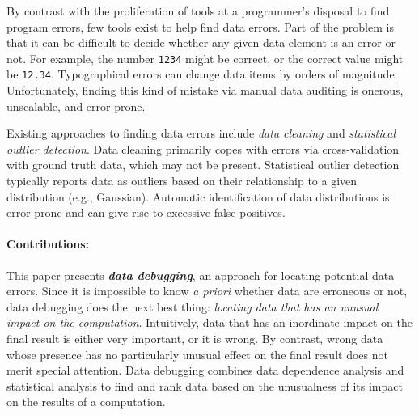 


By contrast with the proliferation of tools at a programmer's disposal
to find program errors, few tools exist to help find data errors. Part
of the problem is that it can be difficult to decide whether any given
data element is an error or not. For example, the number \texttt{1234}
might be correct, or the correct value might
be \texttt{12.34}. Typographical errors can change data items by
orders of magnitude. Unfortunately, finding this kind of mistake via
manual data auditing is onerous, unscalable, and error-prone.




Existing approaches to finding data errors include
\emph{data cleaning} and  \emph{statistical outlier detection}.
Data cleaning primarily copes with errors via
cross-validation with ground truth data, which may not be
present. Statistical outlier detection typically reports data as
outliers based on their relationship to a given distribution (e.g.,
Gaussian).  Automatic identification of data distributions is
error-prone and can give rise to excessive false positives.



\paragraph{Contributions:}
This paper presents \emph{\bf data debugging}, an approach for locating
potential data errors. Since it is impossible to know \emph{a priori}
whether data are erroneous or not, data debugging does the next best
thing: \emph{locating data that has an unusual
impact on the computation}. Intuitively, data that has an inordinate impact on the final
result is either very important, or it is wrong. By contrast, wrong
data whose presence has no particularly unusual effect on the final result does not
merit special attention.  Data debugging combines data dependence
analysis and statistical analysis to find and rank data based on the unusualness of its
impact on the results of a computation.

